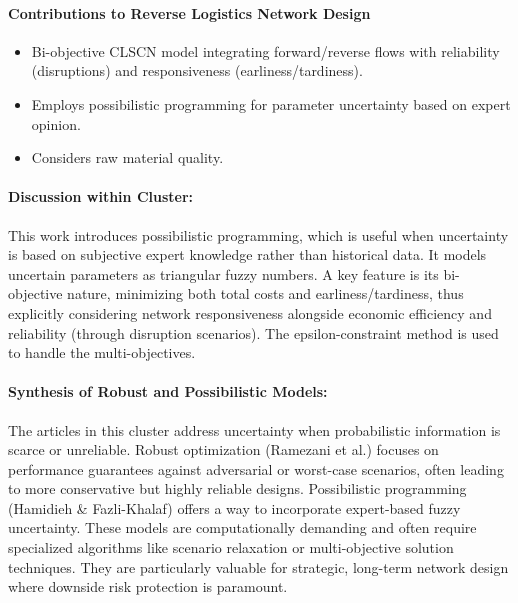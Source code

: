 \paragraph{Contributions to Reverse Logistics Network Design}
\begin{itemize}
    \item Bi-objective CLSCN model integrating forward/reverse flows with reliability (disruptions) and responsiveness (earliness/tardiness).
    \item Employs possibilistic programming for parameter uncertainty based on expert opinion.
    \item Considers raw material quality.
\end{itemize}
\paragraph{Discussion within Cluster:} This work introduces possibilistic programming, which is useful when uncertainty is based on subjective expert knowledge rather than historical data. It models uncertain parameters as triangular fuzzy numbers. A key feature is its bi-objective nature, minimizing both total costs and earliness/tardiness, thus explicitly considering network responsiveness alongside economic efficiency and reliability (through disruption scenarios). The epsilon-constraint method is used to handle the multi-objectives.

\paragraph{Synthesis of Robust and Possibilistic Models:}
The articles in this cluster address uncertainty when probabilistic information is scarce or unreliable. Robust optimization (Ramezani et al.) focuses on performance guarantees against adversarial or worst-case scenarios, often leading to more conservative but highly reliable designs. Possibilistic programming (Hamidieh \& Fazli-Khalaf) offers a way to incorporate expert-based fuzzy uncertainty. These models are computationally demanding and often require specialized algorithms like scenario relaxation or multi-objective solution techniques. They are particularly valuable for strategic, long-term network design where downside risk protection is paramount.